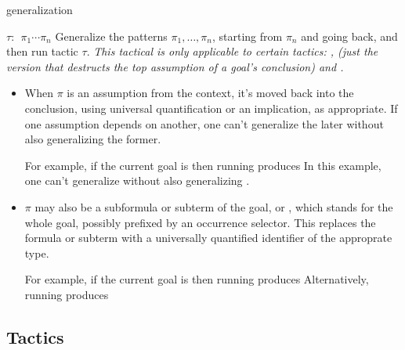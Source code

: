 \begin{tactic}{generalization}
  \begin{tsyntax}[empty]{$\tau$: $\;\pi_1 \cdots \pi_n$}
    Generalize the patterns $\pi_1, \ldots, \pi_n$, starting from
    $\pi_n$ and going back, and then run tactic $\tau$.  \emph{This
      tactical is only applicable to certain tactics: ,
       (just the version that destructs the top
      assumption of a goal's conclusion) and .}

    \begin{itemize}
    \item When $\pi$ is an assumption from the context, it's moved
      back into the conclusion, using universal quantification or an
      implication, as appropriate. If one assumption depends on
      another, one can't generalize the later without also
      generalizing the former.

      For example, if the current goal is
       then
      running 
      produces
       In
      this example, one can't generalize  without also
      generalizing .

    \item $\pi$ may also be a subformula or subterm of the goal, or
      \ec{_}, which stands for the whole goal, possibly prefixed by an
      occurrence selector. This replaces the formula or subterm with a
      universally quantified identifier of the approprate type.

      For example, if the current goal is
       then
      running 
      produces
      Alternatively, running
      produces
    \end{itemize}
  \end{tsyntax}
\end{tactic}

\subsection{Tactics}

